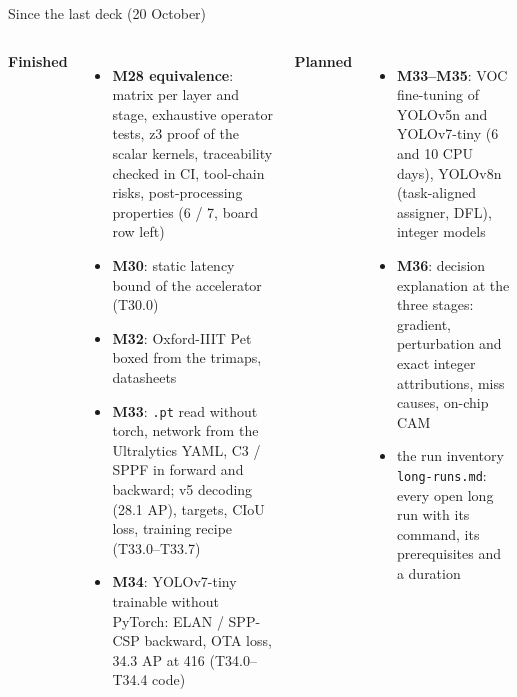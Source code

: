 \documentclass[aspectratio=169,11pt]{beamer}
\begin{document}
\begin{frame}{Since the last deck (20 October)}
  \footnotesize
  \begin{columns}[T]
    \textbf{Finished}
    \begin{itemize}
      \item \textbf{M28 equivalence}: matrix per layer and stage, exhaustive operator tests,
        z3 proof of the scalar kernels, traceability checked in CI, tool-chain risks,
        post-processing properties (6 / 7, board row left)
      \item \textbf{M30}: static latency bound of the accelerator (T30.0)
      \item \textbf{M32}: Oxford-IIIT Pet boxed from the trimaps, datasheets
      \item \textbf{M33}: \texttt{.pt} read without torch, network from the Ultralytics
        YAML, C3 / SPPF in forward and backward; v5 decoding (28.1 AP), targets, CIoU loss,
        training recipe (T33.0--T33.7)
      \item \textbf{M34}: YOLOv7-tiny trainable without PyTorch: ELAN / SPP-CSP backward,
        OTA loss, 34.3 AP at 416 (T34.0--T34.4 code)
    \end{itemize}
    \textbf{Planned}
    \begin{itemize}
      \item \textbf{M33--M35}: VOC fine-tuning of YOLOv5n and YOLOv7-tiny (6 and 10 CPU
        days), YOLOv8n (task-aligned assigner, DFL), integer models
      \item \textbf{M36}: decision explanation at the three stages: gradient, perturbation
        and exact integer attributions, miss causes, on-chip CAM
      \item the run inventory \texttt{long-runs.md}: every open long run with its command,
        its prerequisites and a duration
    \end{itemize}
  \end{columns}
\end{frame}
\end{document}
